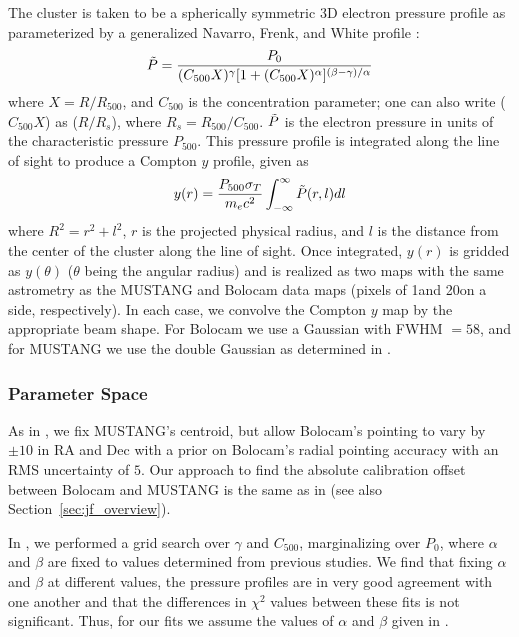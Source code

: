 \documentclass[iop,numberedappendix,apj]{emulateapj}
\begin{document}
{The cluster is taken to be a 
spherically symmetric 3D electron pressure profile as parameterized by a generalized Navarro, Frenk,
and White profile \citep[hereafter, gNFW][]{navarro1997,nagai2007}:
\begin{equation}
  \Tilde{P} = \frac{P_0}{(C_{500} X)^{\gamma} [1 + (C_{500} X)^{\alpha}]^{(\beta - \gamma)/\alpha}}
\end{equation}
where $X = R / R_{500}$, and $C_{500}$ is the concentration parameter; one can also write ($C_{500} X$) as
($R / R_s$), where $R_s = R_{500}/C_{500}$. $\Tilde{P}$ is the electron pressure in units of the characteristic
pressure $P_{500}$. This pressure profile is integrated along the line of sight to produce 
a Compton $y$ profile, given as 
\begin{equation}
  y(r) = \frac{P_{500} \sigma_{T}}{m_e c^2} \int_{-\infty}^{\infty} \Tilde{P}(r,l) dl
\end{equation}
where $R^2 = r^2 + l^2$, $r$ is the projected physical radius, and $l$ is the distance from the center of the cluster
along the line of sight. Once integrated, $y(r)$ is gridded as $y(\theta)$ ($\theta$ being the angular radius) 
and is realized as two maps with
the same astrometry as the MUSTANG and Bolocam data maps (pixels of 1\asecs and 20\asecs on a side, respectively). 
In each case, we convolve the Compton $y$ map by the appropriate beam shape. For Bolocam we use a Gaussian with FWHM
$= 58$\asec, and for MUSTANG we use the double Gaussian as determined in \citet{romero2015a}.

\subsubsection{Parameter Space}
\label{sec:param_space}

As in \citet{romero2015a}, we fix MUSTANG's centroid, but allow Bolocam's pointing to vary by $\pm 10$\asecs 
in RA and Dec with a prior on Bolocam's radial pointing accuracy with an RMS uncertainty of $5$\asec. Our 
approach to find the absolute calibration offset between Bolocam and MUSTANG is the same as in
\citet{romero2015a} (see also Section~\ref{sec:jf_overview}). 

In \citet{romero2015a}, we performed a grid search over $\gamma$ and $C_{500}$, marginalizing over $P_0$,
where $\alpha$ and $\beta$ are fixed to values determined from previous studies. We find that fixing
$\alpha$ and $\beta$ at different values, the pressure profiles are in very 
good agreement with one another and that the 
differences in $\chi^2$ values between these fits is not significant. Thus, for our fits 
we assume the values of $\alpha$ and $\beta$ given in .

}
\end{document}
